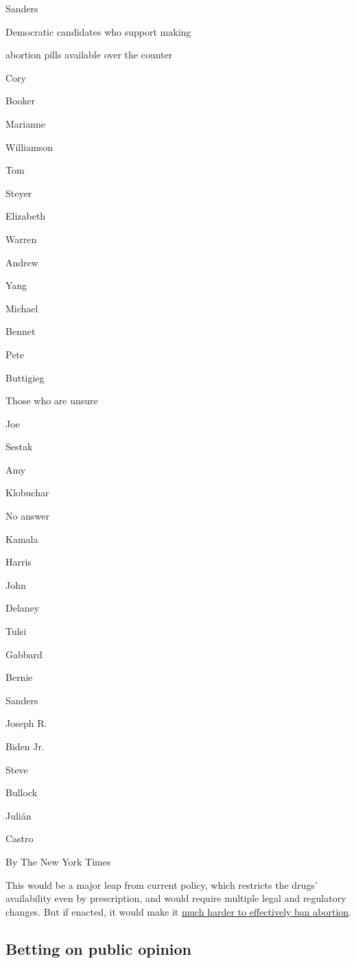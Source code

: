 Sanders

Democratic candidates who support making

abortion pills available over the counter

Cory

Booker

Marianne

Williamson

Tom

Steyer

Elizabeth

Warren

Andrew

Yang

Michael

Bennet

Pete

Buttigieg

Those who are unsure

Joe

Sestak

Amy

Klobuchar

No answer

Kamala

Harris

John

Delaney

Tulsi

Gabbard

Bernie

Sanders

Joseph R.

Biden Jr.

Steve

Bullock

Julián

Castro

By The New York Times

This would be a major leap from current policy, which restricts the
drugs' availability even by prescription, and would require multiple
legal and regulatory changes. But if enacted, it would make it
\href{https://www.nytimes3xbfgragh.onion/2018/07/01/science/abortion-supreme-court-trump.html}{much
harder to effectively ban abortion}.

\hypertarget{betting-on-public-opinion}{%
\subsection{Betting on public opinion}\label{betting-on-public-opinion}}

